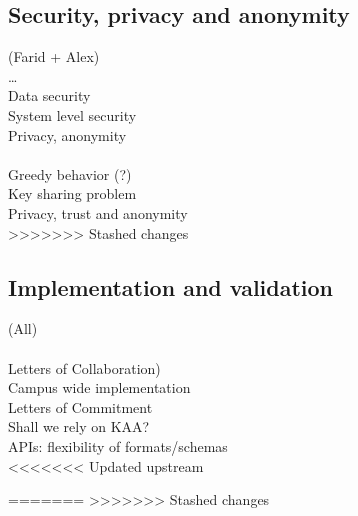 \subsection{Security, privacy and anonymity}
(Farid + Alex)\\
…\\
Data security\\
System level security\\
Privacy, anonymity\\
\\
Greedy behavior (?)\\
Key sharing problem\\ 
Privacy, trust and anonymity \\

>>>>>>> Stashed changes
\subsection{Implementation and validation }
(All)\\
\\
Letters of Collaboration)\\
Campus wide implementation \\
Letters of Commitment\\
Shall we rely on KAA?\\
APIs: flexibility of formats/schemas\\
<<<<<<< Updated upstream

 
=======
>>>>>>> Stashed changes
